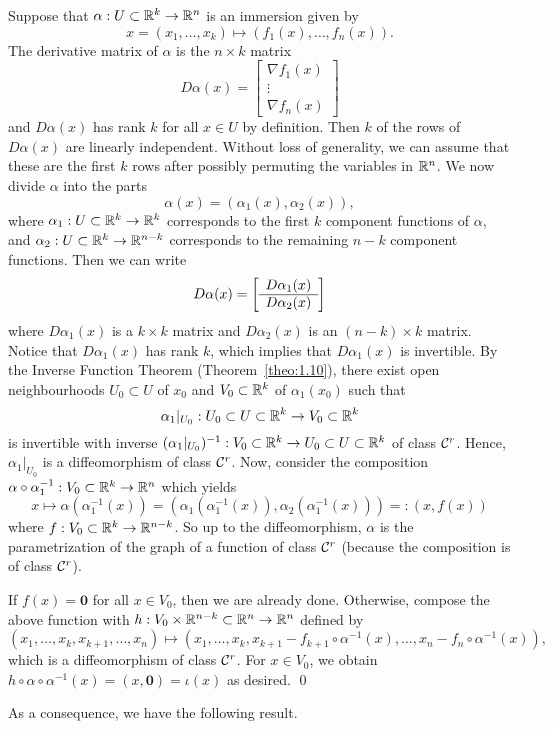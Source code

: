 \begin{pf}
    Suppose that $\alpha : U \subset \mathbb{R}^k \to \mathbb{R}^n$ is an immersion given by 
    \[ x = (x_1, \dots, x_k) \mapsto (f_1(x), \dots, f_n(x)). \] 
    The derivative matrix of $\alpha$ is the $n \times k$ matrix 
    \[ D\alpha(x) = \begin{bmatrix}
        \nabla f_1(x) \\ \vdots \\ \nabla f_n(x) 
    \end{bmatrix} \] 
    and $D\alpha(x)$ has rank $k$ for all $x \in U$ by definition. Then 
    $k$ of the rows of $D\alpha(x)$ are linearly independent. Without loss of 
    generality, we can assume that these are the first $k$ rows after possibly 
    permuting the variables in $\mathbb{R}^n$. We now divide $\alpha$ into 
    the parts 
    \[ \alpha(x) = (\alpha_1(x), \alpha_2(x)), \] 
    where $\alpha_1 : U \subset \mathbb{R}^k \to \mathbb{R}^k$ corresponds to the first 
    $k$ component functions of $\alpha$, and $\alpha_2 : U \subset \mathbb{R}^k \to \mathbb{R}^{n-k}$ 
    corresponds to the remaining $n-k$ component functions. Then we can write 
    \[ D\alpha(x) = \mleft[ \begin{array}{c} D\alpha_1(x) \\ \hline D\alpha_2(x) \end{array} \mright] \]
    where $D\alpha_1(x)$ is a $k \times k$ matrix and $D\alpha_2(x)$ is an 
    $(n-k) \times k$ matrix. Notice that $D\alpha_1(x)$ has rank $k$, which 
    implies that $D\alpha_1(x)$ is invertible. By the Inverse Function Theorem 
    (Theorem~\ref{theo:1.10}), there exist open neighbourhoods $U_0 \subset U$ 
    of $x_0$ and $V_0 \subset \mathbb{R}^k$ of $\alpha_1(x_0)$ such that 
    \[ \alpha_1|_{U_0} : U_0 \subset U \subset \mathbb{R}^k \to V_0 \subset \mathbb{R}^k \] 
    is invertible with inverse 
    $(\alpha_1|_{U_0})^{-1} : V_0 \subset \mathbb{R}^k \to U_0 \subset U \subset \mathbb{R}^k$ 
    of class ${\cal C}^r$. Hence, $\alpha_1|_{U_0}$ is a diffeomorphism of class ${\cal C}^r$. 
    Now, consider the composition $\alpha \circ \alpha_1^{-1} : 
    V_0 \subset \mathbb{R}^k \to \mathbb{R}^n$ which yields 
    \[ x \mapsto \alpha(\alpha_1^{-1}(x)) = (\alpha_1(\alpha_1^{-1}(x)), 
    \alpha_2(\alpha_1^{-1}(x))) =: (x, f(x)) \]  
    where $f : V_0 \subset \mathbb{R}^k \to \mathbb{R}^{n-k}$. So up to the diffeomorphism, 
    $\alpha$ is the parametrization of the graph of a function of class ${\cal C}^r$ 
    (because the composition is of class ${\cal C}^r$). 

    If $f(x) = \mathbf 0$ for all $x \in V_0$, then we are already done. Otherwise, 
    compose the above function with $h : V_0 \times \mathbb{R}^{n-k} \subset \mathbb{R}^n 
    \to \mathbb{R}^n$ defined by 
    \[ (x_1, \dots, x_k, x_{k+1}, \dots, x_n) \mapsto 
    (x_1, \dots, x_k, x_{k+1} - f_{k+1} \circ \alpha^{-1}(x), \dots, 
    x_n - f_n \circ \alpha^{-1}(x)), \] 
    which is a diffeomorphism of class ${\cal C}^r$. For $x \in V_0$, we obtain 
    $h \circ \alpha \circ \alpha^{-1}(x) = (x, \mathbf 0) = \iota(x)$ as desired. \qed 
\end{pf}\vspace{-0.25cm}
As a consequence, we have the following result. 

